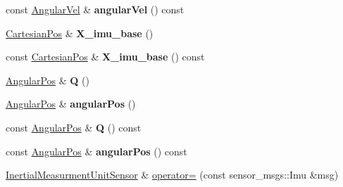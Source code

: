\begin{DoxyCompactItemize}
\item 
const \hyperlink{classow__core_1_1AngularVelocity}{Angular\+Vel} \& {\bfseries angular\+Vel} () const \hypertarget{classow__core_1_1InertialMeasurmentUnitSensor_abdde467f1e51627a6d77c9294d9c48f5}{}\label{classow__core_1_1InertialMeasurmentUnitSensor_abdde467f1e51627a6d77c9294d9c48f5}

\item 
\hyperlink{classow__core_1_1CartesianPosition}{Cartesian\+Pos} \& {\bfseries X\+\_\+imu\+\_\+base} ()\hypertarget{classow__core_1_1InertialMeasurmentUnitSensor_ab4d28fa5bb1d541cde59b20f78c45f0a}{}\label{classow__core_1_1InertialMeasurmentUnitSensor_ab4d28fa5bb1d541cde59b20f78c45f0a}

\item 
const \hyperlink{classow__core_1_1CartesianPosition}{Cartesian\+Pos} \& {\bfseries X\+\_\+imu\+\_\+base} () const \hypertarget{classow__core_1_1InertialMeasurmentUnitSensor_aea72d4d464905eff1b0aa2d38e538c72}{}\label{classow__core_1_1InertialMeasurmentUnitSensor_aea72d4d464905eff1b0aa2d38e538c72}

\item 
\hyperlink{classow__core_1_1AngularPosition}{Angular\+Pos} \& {\bfseries Q} ()\hypertarget{classow__core_1_1InertialMeasurmentUnitSensor_a5d29b3cb1aa6b051248fb1360c6e59d6}{}\label{classow__core_1_1InertialMeasurmentUnitSensor_a5d29b3cb1aa6b051248fb1360c6e59d6}

\item 
\hyperlink{classow__core_1_1AngularPosition}{Angular\+Pos} \& {\bfseries angular\+Pos} ()\hypertarget{classow__core_1_1InertialMeasurmentUnitSensor_a05583c294309a4a2695f3e30a9c63712}{}\label{classow__core_1_1InertialMeasurmentUnitSensor_a05583c294309a4a2695f3e30a9c63712}

\item 
const \hyperlink{classow__core_1_1AngularPosition}{Angular\+Pos} \& {\bfseries Q} () const \hypertarget{classow__core_1_1InertialMeasurmentUnitSensor_ab830feb8cffe385a4a71dd9e290624d2}{}\label{classow__core_1_1InertialMeasurmentUnitSensor_ab830feb8cffe385a4a71dd9e290624d2}

\item 
const \hyperlink{classow__core_1_1AngularPosition}{Angular\+Pos} \& {\bfseries angular\+Pos} () const \hypertarget{classow__core_1_1InertialMeasurmentUnitSensor_a37339c0d1beeb20e64593cd8b009c2a0}{}\label{classow__core_1_1InertialMeasurmentUnitSensor_a37339c0d1beeb20e64593cd8b009c2a0}

\item 
\hyperlink{classow__core_1_1InertialMeasurmentUnitSensor}{Inertial\+Measurment\+Unit\+Sensor} \& \hyperlink{classow__core_1_1InertialMeasurmentUnitSensor_ab92c7bda365533503f84e700ad09cd99}{operator=} (const sensor\+\_\+msgs\+::\+Imu \&msg)\hypertarget{classow__core_1_1InertialMeasurmentUnitSensor_ab92c7bda365533503f84e700ad09cd99}{}\label{classow__core_1_1InertialMeasurmentUnitSensor_ab92c7bda365533503f84e700ad09cd99}


\end{DoxyCompactItemize}
